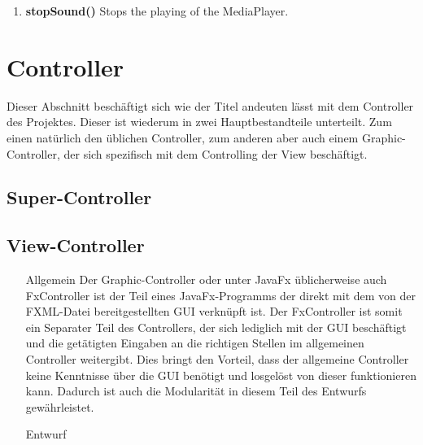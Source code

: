 \documentclass{article}
\begin{document}
\begin{enumerate}
{\begin{enumerate}[+]
{					Therefore it checs the given position if it is valid.
					Then it loads the File from the path that is stored at the soundList at the given Position.
					If the File could not be loaded the Method stops.
					Else the loaded File will be passed on to the MediaPlayer of this class.
					The MediaPlayer will be started, so that the Sound is played.
					\newline
					\textbf{@param listPosition}
						The position of the Sound at the soundList that should be played.
						\newline
				}
				\item{
					\textbf{stopSound()} \newline
					Stops the playing of the MediaPlayer.
					\newline
				}
			\end{enumerate}
	}
	\end{enumerate}	
	
	
	\section{Controller}
	Dieser Abschnitt beschäftigt sich wie der Titel andeuten lässt mit dem Controller des Projektes.
	Dieser ist wiederum in zwei Hauptbestandteile unterteilt.
		Zum einen natürlich den üblichen Controller, zum anderen aber auch einem Graphic-Controller, der sich spezifisch mit dem Controlling der View beschäftigt.
	
	\subsection{Super-Controller}
	
	\subsection{View-Controller}
	\begin{enumerate}
	\item[Allgemein]{
		Der Graphic-Controller oder unter JavaFx üblicherweise auch FxController ist der Teil eines JavaFx-Programms der direkt mit dem von der FXML-Datei bereitgestellten GUI verknüpft ist.
		Der FxController ist somit ein Separater Teil des Controllers, der sich lediglich mit der GUI beschäftigt und die getätigten Eingaben an die richtigen Stellen im allgemeinen Controller weitergibt.
			Dies bringt den Vorteil, dass der allgemeine Controller keine Kenntnisse über die GUI benötigt und losgelöst von dieser funktionieren kann.
			Dadurch ist auch die Modularität in diesem Teil des Entwurfs gewährleistet.
	}
	\item[Entwurf]{
		
	}
	\end{enumerate}
	
\end{document}
